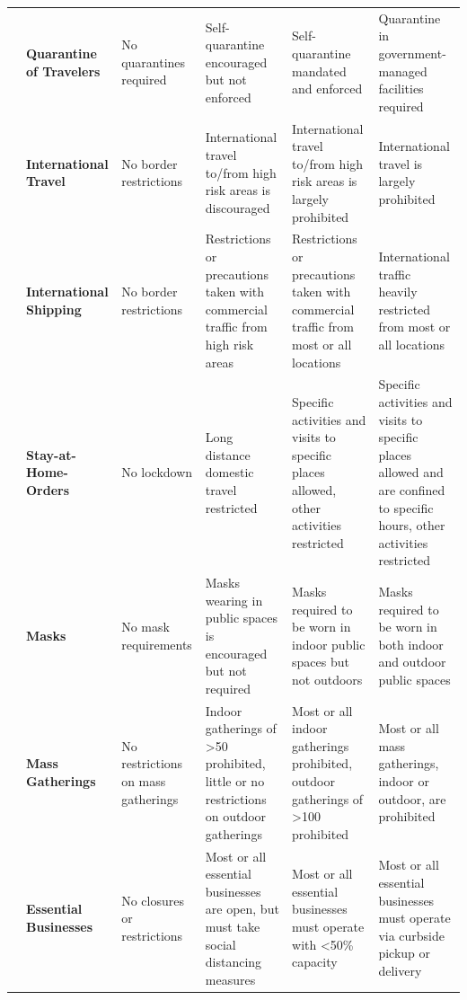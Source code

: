 \begin{landscape}
\begin{longtable}{| C{2cm} |  C{2cm} |C{3cm} |C{3cm} |C{3cm} |C{3cm}|}
 & \textbf{Quarantine of Travelers} &  No quarantines required & Self-quarantine encouraged but not enforced & Self-quarantine mandated and enforced & Quarantine in government-managed facilities required \\ 

& \textbf{International Travel} & No border restrictions & International travel to/from high risk areas is discouraged & International travel to/from high risk areas is largely prohibited & International travel is largely prohibited \\ 

& \textbf{International Shipping} & No border restrictions & Restrictions or precautions taken with commercial traffic from high risk areas & Restrictions or precautions taken with commercial traffic from most or all locations & International traffic heavily restricted from most or all locations \\ \hline



 & \textbf{Stay-at-Home-Orders} & No lockdown & Long distance domestic travel restricted & Specific activities and visits to specific places allowed, other activities restricted & Specific activities and visits to specific places allowed and are confined to specific hours, other activities restricted \\ 

& \textbf{Masks} & No mask requirements & Masks wearing in public spaces is encouraged but not required & Masks required to be worn in indoor public spaces but not outdoors & Masks required to be worn in both indoor and outdoor public spaces \\ 

& \textbf{Mass Gatherings} & No restrictions on mass gatherings & Indoor gatherings of >50 prohibited, little or no restrictions on outdoor gatherings & Most or all indoor gatherings prohibited, outdoor gatherings of >100 prohibited & Most or all mass gatherings, indoor or outdoor, are prohibited \\ \hline



 & \textbf{Essential Businesses} & No closures or restrictions & Most or all essential businesses are open, but must take social distancing measures & Most or all essential businesses must operate with <50\% capacity & Most or all essential businesses must operate via curbside pickup or delivery \\ 


\end{longtable}
\end{landscape}
